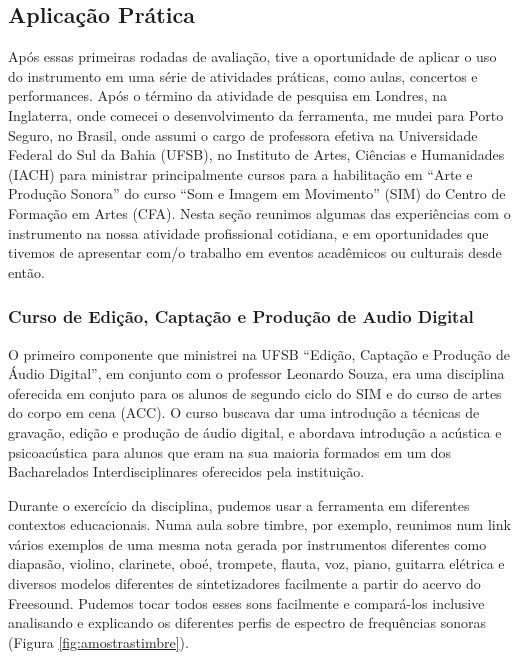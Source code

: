 \subsection{Aplicação Prática}
Após essas primeiras rodadas de avaliação, tive a oportunidade de aplicar o uso do instrumento em uma série de atividades práticas, como aulas, concertos e performances. Após o término da atividade de pesquisa em Londres, na Inglaterra, onde comecei o desenvolvimento da ferramenta, me mudei para Porto Seguro, no Brasil, onde assumi o cargo de professora efetiva na Universidade Federal do Sul da Bahia (UFSB), no Instituto de Artes, Ciências e Humanidades (IACH) para ministrar principalmente cursos para a habilitação em ``Arte e Produção Sonora'' do curso ``Som e Imagem em Movimento'' (SIM) do Centro de Formação em Artes (CFA). Nesta seção reunimos algumas das experiências com o instrumento na nossa atividade profissional cotidiana, e em oportunidades que tivemos de apresentar com/o trabalho em eventos acadêmicos ou culturais desde então.


\subsubsection{Curso de Edição, Captação e Produção de Audio Digital}

O primeiro componente que ministrei na UFSB ``Edição, Captação e Produção de Áudio Digital'', em conjunto com o professor Leonardo Souza, era uma disciplina oferecida em conjuto para os alunos de segundo ciclo do SIM e do curso de artes do corpo em cena (ACC). O curso buscava dar uma introdução a técnicas de gravação, edição e produção de áudio digital, e abordava introdução a acústica e psicoacústica para alunos que eram na sua maioria formados em um dos Bacharelados Interdisciplinares oferecidos pela instituição. 

Durante o exercício da disciplina, pudemos usar a ferramenta em diferentes contextos educacionais. Numa aula sobre timbre, por exemplo, reunimos num link vários exemplos de uma mesma nota gerada por instrumentos diferentes como diapasão, violino, clarinete, oboé, trompete, flauta, voz, piano, guitarra elétrica e diversos modelos diferentes de sintetizadores facilmente a partir do acervo do Freesound. Pudemos tocar todos esses sons facilmente e compará-los inclusive analisando e explicando os diferentes perfis de espectro de frequências sonoras (Figura \ref{fig:amostrastimbre}).

